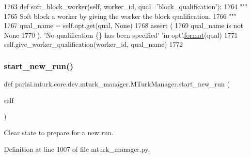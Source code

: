 \begin{DoxyCode}
1763     \textcolor{keyword}{def }soft\_block\_worker(self, worker\_id, qual='block\_qualification'):
1764         \textcolor{stringliteral}{"""}
1765 \textcolor{stringliteral}{        Soft block a worker by giving the worker the block qualification.}
1766 \textcolor{stringliteral}{        """}
1767         qual\_name = self.opt.get(qual, \textcolor{keywordtype}{None})
1768         \textcolor{keyword}{assert} (
1769             qual\_name \textcolor{keywordflow}{is} \textcolor{keywordflow}{not} \textcolor{keywordtype}{None}
1770         ), \textcolor{stringliteral}{'No qualification \{\} has been specified'} \textcolor{stringliteral}{'in opt'}.\hyperlink{namespaceparlai_1_1chat__service_1_1services_1_1messenger_1_1shared__utils_a32e2e2022b824fbaf80c747160b52a76}{format}(qual)
1771         self.give\_worker\_qualification(worker\_id, qual\_name)
1772 
\end{DoxyCode}
\mbox{\label{classparlai_1_1mturk_1_1core_1_1dev_1_1mturk__manager_1_1MTurkManager_ac03227ae652350dbbda8890542c7338b}} 
\subsubsection{\texorpdfstring{start\+\_\+new\+\_\+run()}{start\_new\_run()}}
{\footnotesize\ttfamily def parlai.\+mturk.\+core.\+dev.\+mturk\+\_\+manager.\+M\+Turk\+Manager.\+start\+\_\+new\+\_\+run (\begin{DoxyParamCaption}\item[{}]{self }\end{DoxyParamCaption})}

\begin{DoxyVerb}Clear state to prepare for a new run.
\end{DoxyVerb}
 

Definition at line 1007 of file mturk\+\_\+manager.\+py.


